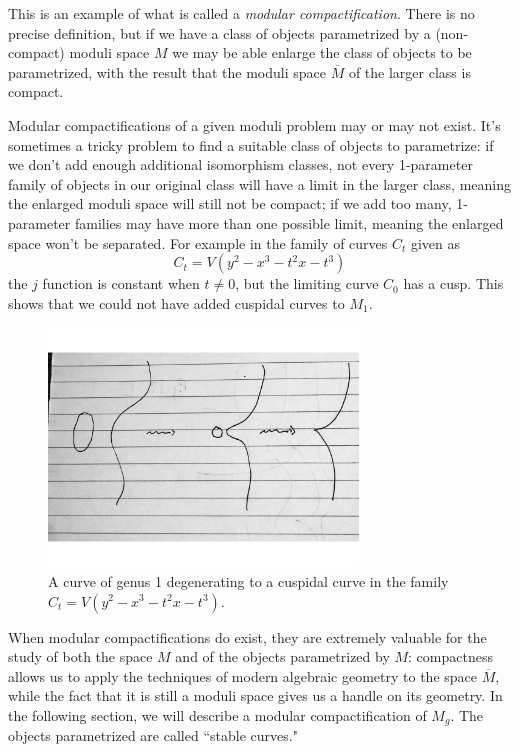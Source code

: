 This is an example of what is called a \emph{modular compactification}. There is no precise definition, but if we have a class of objects parametrized by a (non-compact) moduli space $M$ we may be able enlarge the class of objects to be parametrized, with the result that the moduli space $\overline M$ of the larger class is compact. 

Modular compactifications of a given moduli problem may or may not exist. It's sometimes a tricky problem to find a suitable class of objects to parametrize: if we don't add enough additional isomorphism classes, not every 1-parameter family of objects in our original class will have a limit in the larger class, meaning the enlarged moduli space will still not be compact; if we add too many,  1-parameter families may have more than one possible limit, meaning the enlarged space won't be separated. For example in the family
 of curves $C_t$ given as
$$
C_t = V(y^2 -x^3 - t^2x - t^3)
$$
the $j$ function is constant when $t\neq 0$, but  the limiting curve $C_0$ has a cusp. This shows that
we could not have added cuspidal curves to $M_1$.

\begin{figure}\label {Fig7.A}
\centerline {\includegraphics[height=2.5in]{"Fig7.A.pdf"}}
\caption{A curve of genus 1 degenerating to a cuspidal curve in the family $
C_t = V(y^2 -x^3 - t^2x - t^3)$.
}
\label{default}
\end{figure}


 When modular compactifications do exist, they are extremely valuable for the study of both the space $M$ and of the objects parametrized by $M$: compactness allows us to apply the techniques of modern algebraic geometry to the space $\overline M$, while the fact that it is still a moduli space gives us a handle on its geometry. In the following section, we will describe a modular compactification of $M_g$. The objects parametrized are called ``stable curves."

